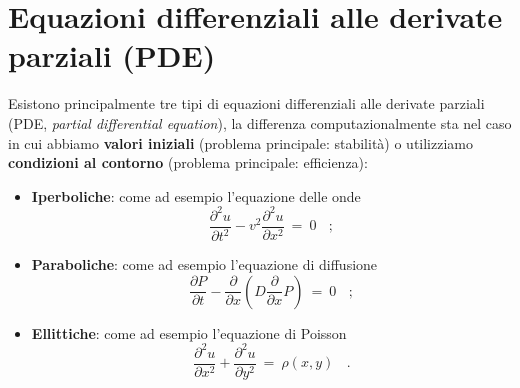 \documentclass{article}
\begin{document}
	\newpage
	\section{Equazioni differenziali alle derivate parziali (PDE)}
	Esistono principalmente tre tipi di equazioni differenziali alle derivate parziali (PDE, \emph{partial differential equation}), la differenza computazionalmente sta nel caso in cui abbiamo \textbf{valori iniziali} (problema principale: stabilità) o utilizziamo \textbf{condizioni al contorno} (problema principale: efficienza):
	\begin{itemize}
		\item \textbf{Iperboliche}: come ad esempio l'equazione delle onde 
		\begin{equation}
			\boxed{\frac{\partial^2 u}{\partial t^2} - v^2 \frac{\partial^2 u}{\partial x^2}\ =\ 0}\ \ \ \ ; 
		\end{equation}
		\item \textbf{Paraboliche}: come ad esempio l'equazione di diffusione 
		\begin{equation}
			\boxed{\frac{\partial P}{\partial t} - \frac{\partial}{\partial x}\left( D\frac{\partial }{\partial x}P\right) \ =\ 0}\ \ \ \ ; 
		\end{equation}
		\item \textbf{Ellittiche}: come ad esempio l'equazione di Poisson 
		\begin{equation}
			\boxed{\frac{\partial^2 u}{\partial x^2} +  \frac{\partial^2 u}{\partial y^2}\ =\ \rho(x, y)}\ \ \ \ .  
		\end{equation}
	\end{itemize}
	
\end{document}

